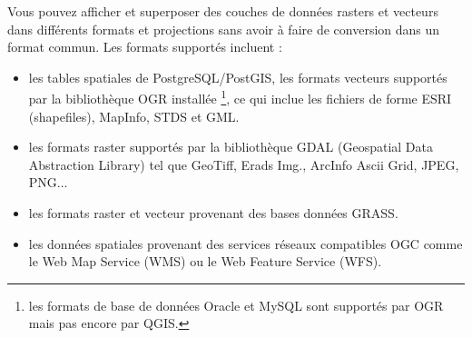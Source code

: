 


Vous pouvez afficher et superposer des couches de donn\'ees rasters et vecteurs dans diff\'erents formats et projections sans avoir \`a faire de conversion dans un format commun. Les formats support\'es incluent :


\begin{itemize}
\item les tables spatiales de PostgreSQL/PostGIS, les formats vecteurs support\'es par la biblioth\`eque OGR install\'ee \footnote{les formats de base de donn\'ees Oracle et MySQL sont support\'es par OGR mais pas encore par QGIS.}, ce qui inclue les fichiers de forme ESRI (shapefiles), MapInfo, STDS et GML.
\item les formats raster support\'es par la biblioth\`eque GDAL (Geospatial Data Abstraction Library) tel que GeoTiff, Erads Img., ArcInfo Ascii Grid, JPEG, PNG...
\item les formats raster et vecteur provenant des bases donn\'ees GRASS. 
\item les donn\'ees spatiales provenant des services r\'eseaux compatibles OGC comme le Web Map Service (WMS) ou le Web Feature Service (WFS).
\end{itemize}


